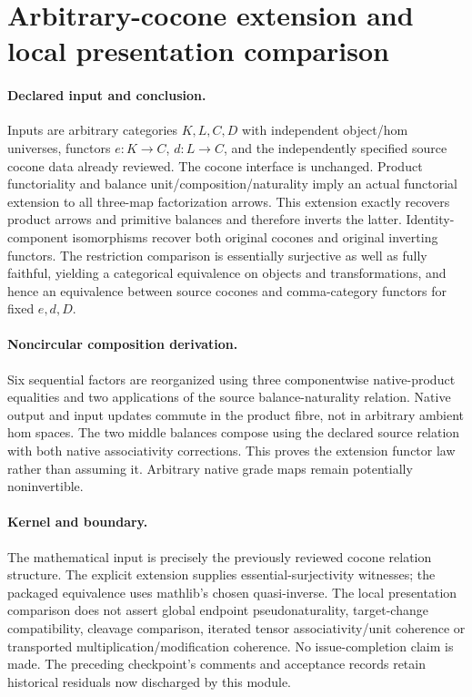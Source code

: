 \documentclass{article}
\begin{document}
\section*{Arbitrary-cocone extension and local presentation comparison}
\paragraph{Declared input and conclusion.} Inputs are arbitrary categories $K,L,C,D$ with independent object/hom universes, functors $e:K\to C$, $d:L\to C$, and the independently specified source cocone data already reviewed. The cocone interface is unchanged. Product functoriality and balance unit/composition/naturality imply an actual functorial extension to all three-map factorization arrows. This extension exactly recovers product arrows and primitive balances and therefore inverts the latter. Identity-component isomorphisms recover both original cocones and original inverting functors. The restriction comparison is essentially surjective as well as fully faithful, yielding a categorical equivalence on objects and transformations, and hence an equivalence between source cocones and comma-category functors for fixed $e,d,D$.
\paragraph{Noncircular composition derivation.} Six sequential factors are reorganized using three componentwise native-product equalities and two applications of the source balance-naturality relation. Native output and input updates commute in the product fibre, not in arbitrary ambient hom spaces. The two middle balances compose using the declared source relation with both native associativity corrections. This proves the extension functor law rather than assuming it. Arbitrary native grade maps remain potentially noninvertible.
\paragraph{Kernel and boundary.} The mathematical input is precisely the previously reviewed cocone relation structure. The explicit extension supplies essential-surjectivity witnesses; the packaged equivalence uses mathlib's chosen quasi-inverse. The local presentation comparison does not assert global endpoint pseudonaturality, target-change compatibility, cleavage comparison, iterated tensor associativity/unit coherence or transported multiplication/modification coherence. No issue-completion claim is made. The preceding checkpoint's comments and acceptance records retain historical residuals now discharged by this module.
\end{document}
